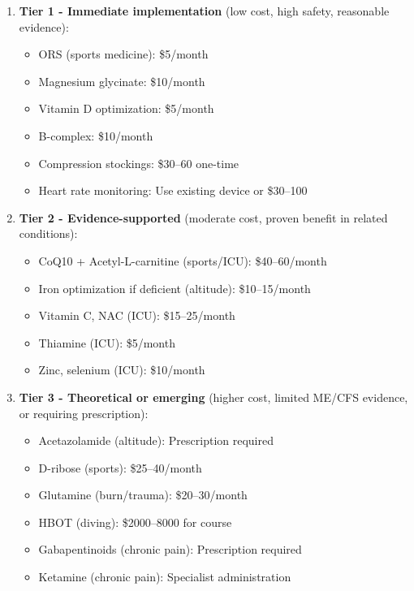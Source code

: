 \begin{enumerate}
    \item \textbf{Tier 1 - Immediate implementation} (low cost, high safety, reasonable evidence):
    \begin{itemize}
        \item ORS (sports medicine): \$5/month
        \item Magnesium glycinate: \$10/month
        \item Vitamin D optimization: \$5/month
        \item B-complex: \$10/month
        \item Compression stockings: \$30--60 one-time
        \item Heart rate monitoring: Use existing device or \$30--100
    \end{itemize}

    \item \textbf{Tier 2 - Evidence-supported} (moderate cost, proven benefit in related conditions):
    \begin{itemize}
        \item CoQ10 + Acetyl-L-carnitine (sports/ICU): \$40--60/month
        \item Iron optimization if deficient (altitude): \$10--15/month
        \item Vitamin C, NAC (ICU): \$15--25/month
        \item Thiamine (ICU): \$5/month
        \item Zinc, selenium (ICU): \$10/month
    \end{itemize}

    \item \textbf{Tier 3 - Theoretical or emerging} (higher cost, limited ME/CFS evidence, or requiring prescription):
    \begin{itemize}
        \item Acetazolamide (altitude): Prescription required
        \item D-ribose (sports): \$25--40/month
        \item Glutamine (burn/trauma): \$20--30/month
        \item HBOT (diving): \$2000--8000 for course
        \item Gabapentinoids (chronic pain): Prescription required
        \item Ketamine (chronic pain): Specialist administration
    \end{itemize}
\end{enumerate}

